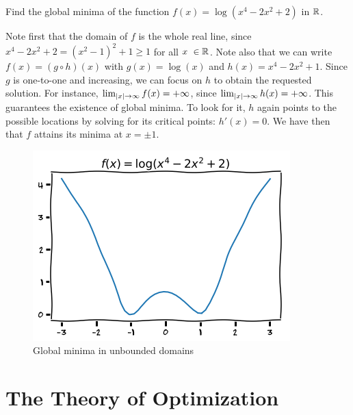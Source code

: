 \begin{example}
Find the global minima of the function $f(x)= \log (x^4-2x^2+2)$ in $\mathbb{R}$.  

Note first that the domain of $f$ is the whole real line, since $x^4-2x^2+2 = (x^2-1)^2+1 \geq 1$ for all $x\ \in \mathbb{R}$.  Note also that we can write $f(x) = (g \circ h)(x)$ with $g(x) = \log(x)$ and $h(x)=x^4-2x^2+1$.  Since $g$ is one-to-one and increasing, we can focus on $h$ to obtain the requested solution.  For instance, $\lim_{\lvert x \rvert\to\infty}f(x) = +\infty$, since $\lim_{\lvert x \rvert\to\infty} h(x) = +\infty$. This guarantees the existence of global minima.  To look for it, $h$ again points to the possible locations by solving for its critical points: $h'(x)=0$.  We have then that $f$ attains its minima at $x=\pm 1$.
\begin{figure}[ht!]
\begin{center}
\includegraphics[width=0.5\linewidth]{coercivelog.png}
\end{center}
\caption{Global minima in unbounded domains}
\label{figure:coercivelog}
\end{figure}
\end{example}

\section{The Theory of Optimization}

